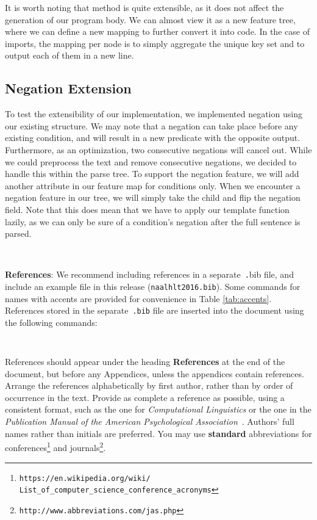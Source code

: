 \documentclass[11pt,letterpaper]{article}
\newcommand\BibTeX{B{\sc ib}\TeX}
\begin{document}
It is worth noting that method is quite extensible, as it does not affect the generation of our program body.
We can almost view it as a new feature tree, where we can define a new mapping to further convert it into code.
In the case of imports, the mapping per node is to simply aggregate the unique key set and to output each of them in a new line.

\subsection{Negation Extension}

To test the extensibility of our implementation, we implemented negation using our existing structure.
We may note that a negation can take place before any existing condition, and will result in a new predicate with the opposite output.
Furthermore, as an optimization, two consecutive negations will cancel out. 
While we could preprocess the text and remove consecutive negations, we decided to handle this within the parse tree.
To support the negation feature, we will add another attribute in our feature map for conditions only.
When we encounter a negation feature in our tree, we will simply take the child and flip the negation field.
Note that this does mean that we have to apply our template function lazily, as we can only be sure of a condition's negation after the full sentence is parsed.

\pagebreak
~
\pagebreak

\textbf{References}:  We recommend
including references in a separate~{\small\texttt .bib} file, and include an example file 
in this release ({\small\tt naalhlt2016.bib}).  Some commands
for names with accents are provided for convenience in Table \ref{tab:accents}.  
References stored in the separate~{\small\tt .bib} file are inserted into the document using the following commands:

\small
\begin{verbatim}


\end{verbatim}
\normalsize 

References should appear under the heading {\bf References} at the 
end of the document, but before any Appendices, unless the appendices contain references.  
Arrange the references alphabetically
by first author, rather than by order of occurrence in the text.  %
Provide as complete a reference as possible, using a consistent format,
such as the one for {\em Computational Linguistics\/} or the one in the 
{\em Publication Manual of the American 
Psychological Association\/}~\cite{APA:83}.  Authors' full names rather than initials are preferred.  You may use
{\bf standard} abbreviations for conferences\footnote{\scriptsize {\tt https://en.wikipedia.org/wiki/ \\ \-\hspace{.75cm} List\_of\_computer\_science\_conference\_acronyms}} and journals\footnote{\tt http://www.abbreviations.com/jas.php}.
\end{document}
